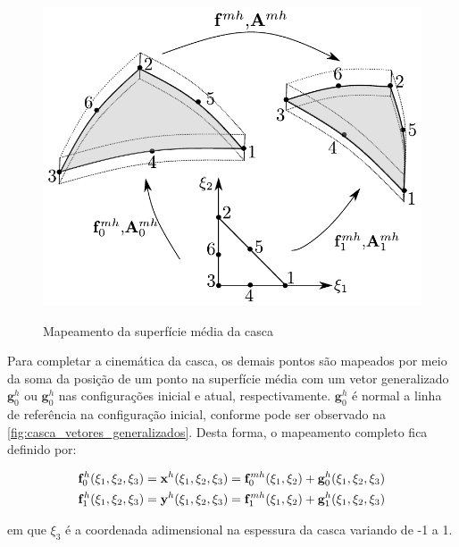 \begin{figure}[!htbp]
	\caption{Mapeamento da superfície média da casca}
	\centering
	\includegraphics[scale=0.8,trim=0cm 0.0cm 0cm 0cm, clip=true]{Imagens/Cap4/casca_super_media.pdf}	
	\label{fig:casca:map_super_media}
\end{figure}

Para completar a cinemática da casca, os demais pontos são mapeados por meio da soma da posição de um ponto na superfície média com um vetor generalizado $\mathbf{g}^{h}_{0}$ ou $\mathbf{g}^{h}_{0}$ nas configurações inicial e atual, respectivamente.  $\mathbf{g}^{h}_{0}$ é normal a linha de referência na configuração inicial, conforme pode ser observado na \autoref{fig:casca_vetores_generalizados}. Desta forma, o mapeamento completo fica definido por:

\begin{align}
\mathbf{f}^{h}_{0}(\xi_{1},\xi_{2},\xi_{3}) = \mathbf{x}^{h}(\xi_{1},\xi_{2},\xi_{3}) = \mathbf{f}^{mh}_{0}(\xi_{1},\xi_{2}) + \mathbf{g}^{h}_{0} (\xi_{1},\xi_{2}, \xi_{3}) \label{eq:fmap0}\\
\mathbf{f}^{h}_{1}(\xi_{1},\xi_{2},\xi_{3}) = \mathbf{y}^{h}(\xi_{1},\xi_{2},\xi_{3}) = \mathbf{f}^{mh}_{1}(\xi_{1},\xi_{2}) + \mathbf{g}^{h}_{1} (\xi_{1},\xi_{2}, \xi_{3})  \label{eq:fmap1}
\end{align}

\noindent em que $\xi_3$ é a coordenada adimensional na espessura da casca variando de -1 a 1.

